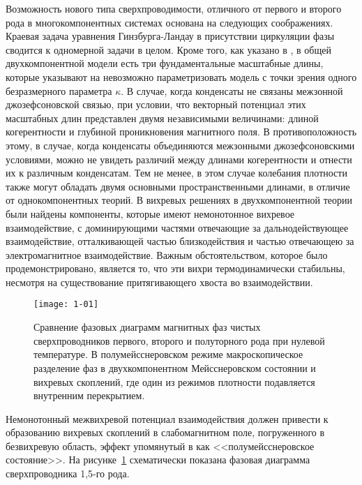 Возможность нового типа сверхпроводимости, отличного от первого и второго рода 
в многокомпонентных системах \cite{bib:1,bib:2} основана на следующих 
соображениях. Краевая задача уравнения Гинзбурга-Ландау в присутствии 
циркуляции фазы сводится к одномерной задачи в целом. Кроме того, как указано в 
\cite{bib:1,bib:2}, в общей двухкомпонентной модели есть три фундаментальные 
масштабные длины, которые указывают на невозможно параметризовать модель с 
точки зрения одного безразмерного параметра \( \kappa \). В случае, когда 
конденсаты не связаны межзонной джозефсоновской связью, при условии, что 
векторный потенциал этих масштабных длин представлен двумя независимыми 
величинами: длиной когерентности и глубиной проникновения магнитного поля. В 
противоположность этому, в случае, когда конденсаты объединяются межзонными 
джозефсоновскими условиями, можно не увидеть различий между длинами 
когерентности и отнести их к различным конденсатам. Тем не менее, в этом 
случае колебания плотности также могут обладать двумя основными 
пространственными длинами\cite{bib:2}, в отличие от однокомпонентных теорий. 
В \cite{bib:1,bib:2} вихревых решениях в двухкомпонентной теории были найдены 
компоненты, которые имеют немонотонное вихревое взаимодействие, с 
доминирующими частями отвечающие за дальнодействующее взаимодействие, 
отталкивающей частью близкодействия и частью отвечающею за электромагнитное 
взаимодействие. Важным обстоятельством, которое было продемонстрировано, 
является то, что эти вихри термодинамически стабильны, несмотря на 
существование притягивающего хвоста во взаимодействии.

\begin{figure}[h!]
    \center
    \texttt{[image: 1-01]}
    \caption{Сравнение фазовых диаграмм магнитных фаз чистых сверхпроводников
        первого, второго и полуторного рода при нулевой температуре. В 
        полумейсснеровском режиме макроскопическое разделение фаз в 
        двухкомпонентном Мейсснеровском состоянии и вихревых скоплений, где 
        один из режимов плотности подавляется внутренним перекрытием.}
    \label{fig:1}
\end{figure}

Немонотонный межвихревой потенциал взаимодействия должен привести к 
образованию вихревых скоплений в слабомагнитном поле, погруженного в 
безвихревую область, эффект упомянутый в \cite{bib:1} как 
<<полумейсснеровское состояние>>. На рисунке~\ref{fig:1} схематически 
показана фазовая диаграмма сверхпроводника 1,5-го рода.

